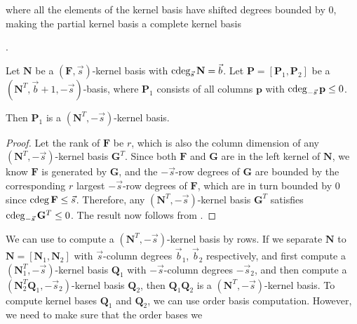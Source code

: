 where all the elements of the kernel basis have shifted degrees bounded
by $0$, making the partial kernel basis a complete kernel basis%
\begin{comment}
, which follows from our requirement of using a shift $\vec{s}\ge\cdeg\mathbf{F}$
\end{comment}
.
\begin{lem}
\label{lem:nullspaceBasisInOrderBasis}Let $\mathbf{N}$ be a $(\mathbf{F},\vec{s})$-kernel
basis with $\cdeg_{\vec{s}}\mathbf{N}=\vec{b}$. Let $\mathbf{P}=\left[\mathbf{P}_{1},\mathbf{P}_{2}\right]$
be a $\left(\mathbf{N}^{T},\vec{b}+1,-\vec{s}\right)$-basis, where
$\mathbf{P}_{1}$ consists of all columns $\mathbf{p}$ with $\cdeg_{-\vec{s}}\mathbf{p}\le0$.
\begin{comment}
of $\mathbf{P}$ satisfying $\mathbf{N}^{T}\mathbf{p}=0$. 
\end{comment}
Then $\mathbf{P}_{1}$ is a $(\mathbf{N}^{T},-\vec{s})$-kernel basis. \end{lem}
\begin{proof}
Let the rank of $\mathbf{F}$ be $r$, which is also the column dimension
of any $(\mathbf{N}^{T},-\vec{s})$-kernel basis $\mathbf{G}^{T}$.
Since both $\mathbf{F}$ and $\mathbf{G}$ are in the left kernel
of $\mathbf{N}$, we know $\mathbf{F}$ is generated by $\mathbf{G}$,
and the $-\vec{s}$-row degrees of $\mathbf{G}$ are bounded by the
corresponding $r$ largest $-\vec{s}$-row degrees of $\mathbf{F}$,
which are in turn bounded by $0$ since $\cdeg\mathbf{F}\le\vec{s}$.
Therefore, any $(\mathbf{N}^{T},-\vec{s})$-kernel basis $\mathbf{G}^{T}$
satisfies $\cdeg_{-\vec{s}}\mathbf{G}^{T}\le0$. The result now follows
from .
\end{proof}
We can use 
to compute a $\left(\mathbf{N}^{T},-\vec{s}\right)$-kernel basis
by rows. If we separate $\mathbf{N}$ to $\mathbf{N}=\left[\mathbf{N}_{1},\mathbf{N}_{2}\right]$
with $\vec{s}$-column degrees $\vec{b}_{1}$, $\vec{b}_{2}$ respectively,
and first compute a $\left(\mathbf{N}_{1}^{T},-\vec{s}\right)$-kernel
basis $\mathbf{Q}_{1}$ with $-\vec{s}$-column degrees $-\vec{s}_{2}$,
and then compute a $\left(\mathbf{N}_{2}^{T}\mathbf{Q}_{1},-\vec{s}_{2}\right)$-kernel
basis $\mathbf{Q}_{2}$, then $\mathbf{Q}_{1}\mathbf{Q}_{2}$ is a
$\left(\mathbf{N}^{T},-\vec{s}\right)$-kernel basis. To compute kernel
bases $\mathbf{Q}_{1}$ and $\mathbf{Q}_{2}$, we can use order basis
computation. However, we need to make sure that the order bases we
